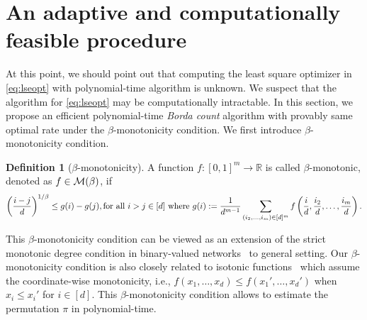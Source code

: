 \documentclass{article}
\theoremstyle{definition}
\newtheorem{defn}{Definition}
\begin{document}
\vspace{-.5cm}
\section{An adaptive and computationally feasible procedure}\label{sec:borda}
\vspace{-.3cm}
At this point, we should point out that computing the least square optimizer in \eqref{eq:lseopt} with polynomial-time algorithm is unknown. We suspect that the algorithm for \eqref{eq:lseopt} may be computationally intractable. In this section, we propose an efficient polynomial-time \emph{Borda count} algorithm with provably same optimal rate under the $\beta$-monotonicity condition.  We first introduce $\beta$-monotonicity condition.  
\begin{defn}[$\beta$-monotonicity]\label{eq:defn}
A function $f\colon[0,1]^m \rightarrow \mathbb{R}$ is called $\beta$-monotonic, denoted as $f\in\mathcal{M}(\beta)$, if 
\begin{align}\label{eq:monotonic}
    \left({i-j\over d}\right)^{1/\beta}\leq g(i)-g(j),\text{for all $i>j\in[d]$ where } g(i): = \frac{1}{d^{m-1}}\sum_{(i_2,\ldots,i_m)\in[d]^m} f\left({i\over d},{i_2\over d},\ldots,{i_m\over d}\right).
\end{align}
\end{defn}\vspace{-.3cm}
This $\beta$-monotonicity condition can be viewed as an extension of the strict monotonic degree condition in binary-valued networks~\citep{chan2014consistent} to general setting.  Our $\beta$-monotonicity condition is also closely related to isotonic functions~\citep{han2019isotonic,pananjady2020isotonic} which assume the coordinate-wise monotonicity, i.e., $f(x_1,\ldots,x_d)\leq f(x_1',\ldots,x_d')$
when $x_i\leq x_i'$ for $i\in[d]$.  This $\beta$-monotonicity condition allows to estimate the permutation $\pi$  in polynomial-time. 
\end{document}
